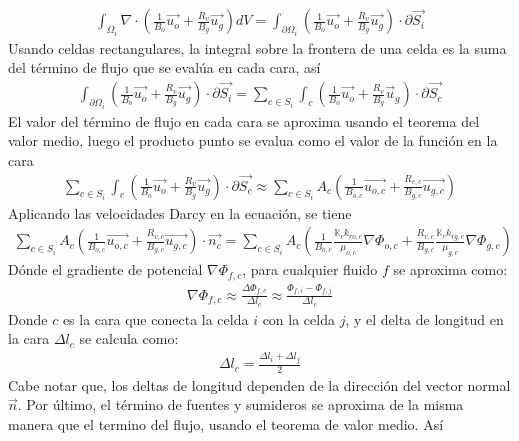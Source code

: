\begin{appendix}
\begin{align*}
	\int_{\Omega_{i}}\nabla \cdot \left( \frac{1}{B_{o}} \vec{u_{o}} + \frac{R_{v}}{B_{g}} \vec{u_{g}} \right)dV = \int_{\partial \Omega_{i}}\left( \frac{1}{B_{o}} \vec{u_{o}} + \frac{R_{v}}{B_{g}} \vec{u_{g}} \right)\cdot \partial \vec{S_{i}}
\end{align*}
Usando celdas rectangulares, la integral sobre la frontera de una celda es la suma del término de flujo que se evalúa en cada cara, así
\begin{align*}
 \int_{\partial \Omega_{i}}\left( \frac{1}{B_{o}} \vec{u_{o}} + \frac{R_{v}}{B_{g}} \vec{u_{g}} \right)\cdot \partial \vec{S_{i}} = \sum_{c \in S_{i}}\int_{c}\left( \frac{1}{B_{o}} \vec{u_{o}} + \frac{R_{v}}{B_{g}} \vec{u}_{g} \right)\cdot \partial \vec{S_{c}}
\end{align*}
El valor del término de flujo en cada cara se aproxima usando el teorema del valor medio, luego el producto punto se evalua como el valor de la función en la cara
\begin{align*}
	\sum_{c \in S_{i}}\int_{c}\left( \frac{1}{B_{o}} \vec{u_{o}} + \frac{R_{v}}{B_{g}} \vec{u_{g}} \right)\cdot \partial \vec{S_{c}} \approx \sum_{c \in S_{i}} A_{c} \left( \frac{1}{B_{o,c}} \vec{u_{o,c}} + \frac{R_{v,c}}{B_{g,c}} \vec{u_{g,c}} \right)
\end{align*}
Aplicando las velocidades Darcy en la ecuación, se tiene
\begin{align*}
	\sum_{c \in S_{i}} A_{c} \left( \frac{1}{B_{o,c}} \vec{u_{o,c}} + \frac{R_{v,c}}{B_{g,c}} \vec{u_{g,c}} \right) \cdot \vec{n_{c}} = \sum_{c \in S_{i}} A_{c} \left( \frac{1}{B_{o,c}} \frac{\mathbb{K}_{c}k_{ro,c}}{\mu_{o,c}} \nabla \Phi_{o,c} + \frac{R_{v,c}}{B_{g,c}} \frac{\mathbb{K}_{c}k_{rg,c}}{\mu_{g,c}} \nabla \Phi_{g,c} \right)
\end{align*}
Dónde el gradiente de potencial $\nabla \Phi_{f,c}$, para cualquier fluido $f$ se aproxima como:
\begin{align*}
	\nabla \Phi_{f,c} \approx \frac{\Delta \Phi_{f,c}}{\Delta l_{c}} \approx \frac{\Phi_{f,i}-\Phi_{f,j}}{\Delta l_{c}}
\end{align*}
Donde $c$ es la cara que conecta la celda $i$ con la celda $j$, y el delta de longitud en la cara $\Delta l_{c}$ se calcula como:
\begin{align}
	\label{ec:DeltaCara}\Delta l_{c} = \frac{\Delta l_{i} + \Delta l_{j}}{2}
\end{align}
Cabe notar que, los deltas de longitud dependen de la dirección del vector normal $\vec{n}$. Por último, el término de fuentes y sumideros se aproxima de la misma manera que el termino del flujo, usando el teorema de valor medio. Así

\end{appendix}
